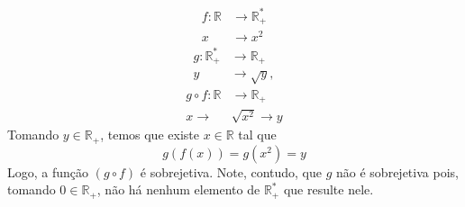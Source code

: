\begin{enumerate}
\begin{align*}
        f: \mathbb{R} &\rightarrow \mathbb{R}^*_+ \\
        x &\rightarrow x^2
    \end{align*}
    \begin{align*}
        g: \mathbb{R}^*_+ &\rightarrow \mathbb{R}_+ \\
        y &\rightarrow \sqrt{y},
    \end{align*}
    \begin{align*}
        g \circ f: \mathbb{R} &\rightarrow \mathbb{R}_+ \\
        x \rightarrow &\sqrt{x^2} \rightarrow y
    \end{align*}
    Tomando $y \in \mathbb{R}_+$, temos que existe $x \in \mathbb{R}$ tal que 
    \begin{displaymath}
        g(f(x)) = g(x^2) = y 
    \end{displaymath}
    Logo, a função $(g \circ f)$ é sobrejetiva. Note, contudo, que $g$ não é sobrejetiva pois, tomando $0 \in \mathbb{R}_+$, não há nenhum elemento de $\mathbb{R}^*_+$ que resulte nele.
\end{enumerate}